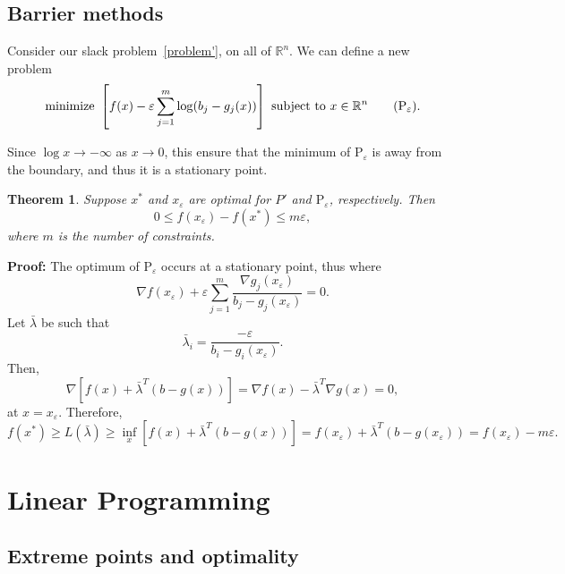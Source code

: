 \documentclass[12pt]{article}
\newtheorem{theorem}{Theorem}[section]
\theoremstyle{definition}
\theoremstyle{remark}
\begin{document}
\subsection{Barrier methods}%
\label{sub:barrier_methods}

Consider our slack problem~\eqref{problem'}, on all of $\mathbb{R}^{n}$. We can define a new problem
\[
	\text{minimize } \left[f(x) - \varepsilon \sum_{j = 1}^{m} \log (b_j - g_j(x)) \right] \text{ subject to } x \in \mathbb{R}^{n} \tag{$\text{P}_{\varepsilon}$}\label{probleme}
.\]

Since $\log x \to -\infty$ as $x \to 0$, this ensure that the minimum of $\text{P}_{\varepsilon}$ is away from the boundary, and thus it is a stationary point.

\begin{theorem}
	Suppose $x^{\ast}$ and $x_{\varepsilon}$ are optimal for $P'$ and $\text{P}_{\varepsilon}$, respectively. Then
	\[
		0 \leq f(x_{\varepsilon}) - f(x^{\ast}) \leq m \varepsilon
	,\]
	where $m$ is the number of constraints.
\end{theorem}

\begin{adjustbox}{minipage = \columnwidth - 25.5pt, margin=1em, frame=1pt, margin=0em}
	\textbf{Proof:} The optimum of $\text{P}_{\varepsilon}$ occurs at a stationary point, thus where
	\[
		\nabla f(x_{\varepsilon}) + \varepsilon \sum_{j = 1}^{m} \frac{\nabla g_j(x_{\varepsilon})}{b_j - g_j(x_{\varepsilon})} = 0
	.\]
	Let $\bar \lambda$ be such that
	\[
		\bar \lambda_i = \frac{-\varepsilon}{b_i - g_i(x_{\varepsilon})}
	.\]
	Then,
	\[
		\nabla \left[ f(x) + \bar \lambda^{T}(b - g(x))\right] = \nabla f(x) - \bar \lambda^{T} \nabla g(x) = 0
	,\]
	at $x = x_{\varepsilon}$. Therefore,
	\[
		f(x^{\ast}) \geq L(\bar \lambda) \geq \inf_{x} \left[f(x) + \bar \lambda^{T}(b - g(x))\right] = f(x_{\varepsilon}) + \bar \lambda^{T}(b - g(x_{\varepsilon})) = f(x_{\varepsilon}) - m \varepsilon
	.\]

\end{adjustbox}

\newpage

\section{Linear Programming}%
\label{sec:linear_programming}

\subsection{Extreme points and optimality}%
\label{sub:extreme_points_and_optimality}
\end{document}
